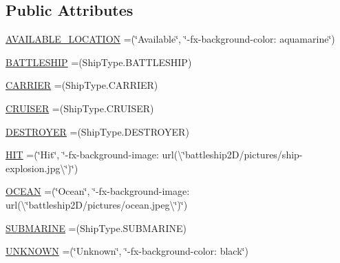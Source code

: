 \subsection*{Public Attributes}
\begin{DoxyCompactItemize}
\item 
\hyperlink{enumbattleship2D_1_1model_1_1CellType_a50f3594d7ffcf1d25b3ff7ba63559d7b}{A\-V\-A\-I\-L\-A\-B\-L\-E\-\_\-\-L\-O\-C\-A\-T\-I\-O\-N} =(\char`\"{}Available\char`\"{}, \char`\"{}-\/fx-\/background-\/color\-: aquamarine\char`\"{})
\item 
\hyperlink{enumbattleship2D_1_1model_1_1CellType_af1cb88f225ce4a6bb31ecc9c44b1ba43}{B\-A\-T\-T\-L\-E\-S\-H\-I\-P} =(Ship\-Type.\-B\-A\-T\-T\-L\-E\-S\-H\-I\-P)
\item 
\hyperlink{enumbattleship2D_1_1model_1_1CellType_a3c23cb8e58884afac9826793bdca060d}{C\-A\-R\-R\-I\-E\-R} =(Ship\-Type.\-C\-A\-R\-R\-I\-E\-R)
\item 
\hyperlink{enumbattleship2D_1_1model_1_1CellType_a45ec63311bbed0763d44b0e6428da6f4}{C\-R\-U\-I\-S\-E\-R} =(Ship\-Type.\-C\-R\-U\-I\-S\-E\-R)
\item 
\hyperlink{enumbattleship2D_1_1model_1_1CellType_a89b7d59bf01fbd390393926de5b840b6}{D\-E\-S\-T\-R\-O\-Y\-E\-R} =(Ship\-Type.\-D\-E\-S\-T\-R\-O\-Y\-E\-R)
\item 
\hyperlink{enumbattleship2D_1_1model_1_1CellType_aedac6244a22b1b1a7a7dc2887ea3827a}{H\-I\-T} =(\char`\"{}Hit\char`\"{}, \char`\"{}-\/fx-\/background-\/image\-: url(\textbackslash{}\char`\"{}battleship2\-D/pictures/ship-\/explosion.\-jpg\textbackslash{}\char`\"{})\char`\"{})
\item 
\hyperlink{enumbattleship2D_1_1model_1_1CellType_af010e793915bcca6ccc54b59d6687b0f}{O\-C\-E\-A\-N} =(\char`\"{}Ocean\char`\"{}, \char`\"{}-\/fx-\/background-\/image\-: url(\textbackslash{}\char`\"{}battleship2\-D/pictures/ocean.\-jpeg\textbackslash{}\char`\"{})\char`\"{})
\item 
\hyperlink{enumbattleship2D_1_1model_1_1CellType_af0cd87a32526f247a9347043d4c57a6e}{S\-U\-B\-M\-A\-R\-I\-N\-E} =(Ship\-Type.\-S\-U\-B\-M\-A\-R\-I\-N\-E)
\item 
\hyperlink{enumbattleship2D_1_1model_1_1CellType_a8d4deb923c1df4cd4148f298e4adfdfb}{U\-N\-K\-N\-O\-W\-N} =(\char`\"{}Unknown\char`\"{}, \char`\"{}-\/fx-\/background-\/color\-: black\char`\"{})
\end{DoxyCompactItemize}
